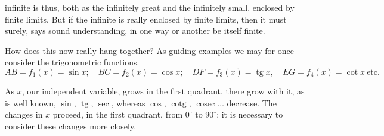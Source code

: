 \documentclass[12pt]{book}
\begin{document}
\begin{center}
\end{center}
infinite is thus, both as the infinitely great and the infinitely small, enclosed
by finite limits. But if the infinite is really enclosed by finite limits, then it
must surely, says sound understanding, in one way or another be itself finite.

How does this now really hang together? As guiding examples we may for once
consider the trigonometric functions.
\[
AB = f_1(x) = \sin x;\quad BC = f_2(x) = \cos x;\quad
DF = f_3(x) = \operatorname{tg} x,\quad EG = f_4(x) = \cot x \ \text{etc.}
\]

\begin{center}
\end{center}

As $x$, our independent variable, grows in the first quadrant, there grow with it,
as is well known, $\sin$, $\operatorname{tg}$, $\sec$, whereas $\cos$,
$\operatorname{cotg}$, $\operatorname{cosec}\ldots$ decrease. The changes in $x$
proceed, in the first quadrant, from $0^{\circ}$ to $90^{\circ}$; it is necessary
to consider these changes more closely.
\end{document}
